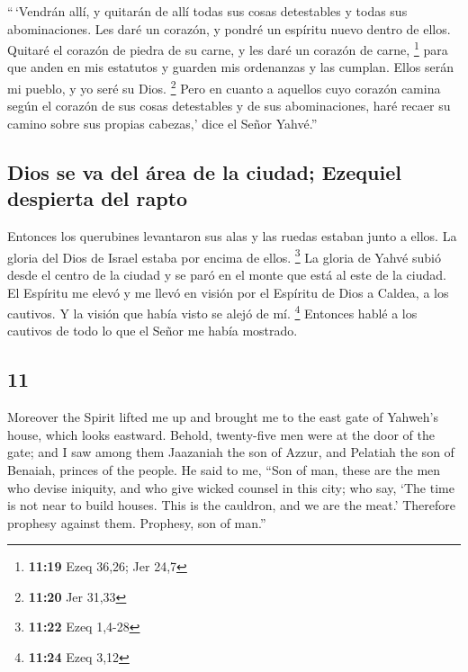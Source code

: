 \begin{paracol}{2}
 ``\,`Vendrán allí, y quitarán de allí todas sus cosas
detestables y todas sus abominaciones.  Les daré un
corazón, y pondré un espíritu nuevo dentro de ellos. Quitaré el corazón
de piedra de su carne, y les daré un corazón de carne, \footnote{\textbf{11:19}
  Ezeq 36,26; Jer 24,7}  para que anden en mis estatutos
y guarden mis ordenanzas y las cumplan. Ellos serán mi pueblo, y yo seré
su Dios. \footnote{\textbf{11:20} Jer 31,33}  Pero en
cuanto a aquellos cuyo corazón camina según el corazón de sus cosas
detestables y de sus abominaciones, haré recaer su camino sobre sus
propias cabezas,' dice el Señor Yahvé.''

\hypertarget{dios-se-va-del-uxe1rea-de-la-ciudad-ezequiel-despierta-del-rapto}{%
\subsection{Dios se va del área de la ciudad; Ezequiel despierta del
rapto}\label{dios-se-va-del-uxe1rea-de-la-ciudad-ezequiel-despierta-del-rapto}}

 Entonces los querubines levantaron sus alas y las ruedas
estaban junto a ellos. La gloria del Dios de Israel estaba por encima de
ellos. \footnote{\textbf{11:22} Ezeq 1,4-28}  La gloria
de Yahvé subió desde el centro de la ciudad y se paró en el monte que
está al este de la ciudad.  El Espíritu me elevó y me
llevó en visión por el Espíritu de Dios a Caldea, a los cautivos. Y la
visión que había visto se alejó de mí. \footnote{\textbf{11:24} Ezeq
  3,12}  Entonces hablé a los cautivos de todo lo que el
Señor me había mostrado.

\switchcolumn
\begin{otherlanguage}{english}

\hypertarget{section-21}{%
\section{11}\label{section-21}}

 Moreover the Spirit lifted me up and brought me to the
east gate of Yahweh's house, which looks eastward. Behold, twenty-five
men were at the door of the gate; and I saw among them Jaazaniah the son
of Azzur, and Pelatiah the son of Benaiah, princes of the people.
 He said to me, ``Son of man, these are the men who devise
iniquity, and who give wicked counsel in this city;  who
say, `The time is not near to build houses. This is the cauldron, and we
are the meat.'  Therefore prophesy against them. Prophesy,
son of man.''


\end{otherlanguage}
\end{paracol}
